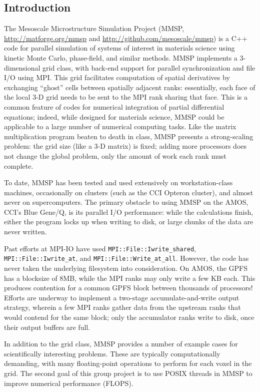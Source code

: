 \documentclass[11pt]{article}
\begin{document}
\begin{multicols}{2}
\section{Introduction}
The Mesoscale Microstructure Simulation Project (MMSP, \url{http://matforge.org/mmsp} and \url{http://github.com/mesoscale/mmsp}) is a C++ code for parallel simulation of systems of interest in materials science using kinetic Monte Carlo, phase-field, and similar methods.
MMSP implements a 3-dimensional grid class, with back-end support for parallel synchronization and file I/O using MPI.
This grid facilitates computation of spatial derivatives by exchanging ``ghost'' cells between spatially adjacent ranks:
essentially, each face of the local 3-D grid needs to be sent to the MPI rank sharing that face.
This is a common feature of codes for numerical integration of partial differential equations;
indeed, while designed for materials science, MMSP could be applicable to a large number of numerical computing tasks.
Like the matrix multiplication program beaten to death in class, MMSP presents a strong-scaling problem:
the grid size (like a 3-D matrix) is fixed; adding more processors does not change the global problem, only the amount of work each rank must complete.

To date, MMSP has been tested and used extensively on workstation-class machines, occasionally on clusters (such as the CCI Opteron cluster), and almost never on supercomputers.
The primary obstacle to using MMSP on the AMOS, CCI's Blue Gene/Q, is its parallel I/O performance:
while the calculations finish, either the program locks up when writing to disk, or large chunks of the data are never written.

Past efforts at MPI-IO have used \texttt{MPI::File::Iwrite\_shared}, \texttt{MPI::File::Iwrite\_at}, and \texttt{MPI::File::Write\_at\_all}.
However, the code has never taken the underlying filesystem into consideration.
On AMOS, the GPFS has a blocksize of 8MB, while the MPI ranks may only write a few KB each.
This produces contention for a common GPFS block between thousands of processors!
Efforts are underway to implement a two-stage accumulate-and-write output strategy, wherein a few MPI ranks gather data from the upstream ranks that would contend for the same block;
only the accumulator ranks write to disk, once their output buffers are full.

In addition to the grid class, MMSP provides a number of example cases for scientifically interesting problems.
These are typically computationally demanding, with many floating-point operations to perform for each voxel in the grid.
The second goal of this group project is to use POSIX threads in MMSP to improve numerical performance (FLOPS).


\end{multicols}
\end{document}
